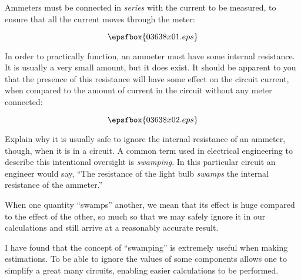 

Ammeters must be connected in {\it series} with the current to be measured, to ensure that all the current moves through the meter:

$$\epsfbox{03638x01.eps}$$

In order to practically function, an ammeter must have some internal resistance.  It is usually a very small amount, but it does exist.  It should be apparent to you that the presence of this resistance will have some effect on the circuit current, when compared to the amount of current in the circuit without any meter connected:

$$\epsfbox{03638x02.eps}$$

Explain why it is usually safe to ignore the internal resistance of an ammeter, though, when it is in a circuit.  A common term used in electrical engineering to describe this intentional oversight is {\it swamping}.  In this particular circuit an engineer would say, ``The resistance of the light bulb {\it swamps} the internal resistance of the ammeter.''







When one quantity ``swamps'' another, we mean that its effect is huge compared to the effect of the other, so much so that we may safely ignore it in our calculations and still arrive at a reasonably accurate result.







I have found that the concept of ``swamping'' is extremely useful when making estimations.  To be able to ignore the values of some components allows one to simplify a great many circuits, enabling easier calculations to be performed. 




